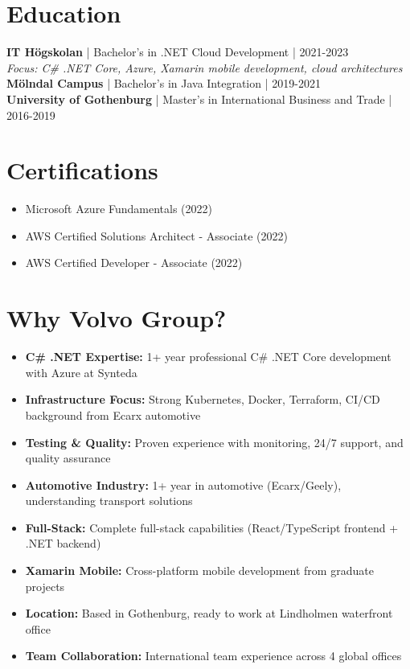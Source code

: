 \documentclass[11pt,a4paper]{article}
\begin{document}
\section*{Education}
\textbf{IT Högskolan} | Bachelor's in .NET Cloud Development | 2021-2023\\
\textit{Focus: C\# .NET Core, Azure, Xamarin mobile development, cloud architectures}\\[5pt]
\textbf{Mölndal Campus} | Bachelor's in Java Integration | 2019-2021\\
\textbf{University of Gothenburg} | Master's in International Business and Trade | 2016-2019

\section*{Certifications}
\begin{itemize}[noitemsep]
\item Microsoft Azure Fundamentals (2022)
\item AWS Certified Solutions Architect - Associate (2022)
\item AWS Certified Developer - Associate (2022)
\end{itemize}

\section*{Why Volvo Group?}
\begin{itemize}[noitemsep]
\item \textbf{C\# .NET Expertise:} 1+ year professional C\# .NET Core development with Azure at Synteda
\item \textbf{Infrastructure Focus:} Strong Kubernetes, Docker, Terraform, CI/CD background from Ecarx automotive
\item \textbf{Testing \& Quality:} Proven experience with monitoring, 24/7 support, and quality assurance
\item \textbf{Automotive Industry:} 1+ year in automotive (Ecarx/Geely), understanding transport solutions
\item \textbf{Full-Stack:} Complete full-stack capabilities (React/TypeScript frontend + .NET backend)
\item \textbf{Xamarin Mobile:} Cross-platform mobile development from graduate projects
\item \textbf{Location:} Based in Gothenburg, ready to work at Lindholmen waterfront office
\item \textbf{Team Collaboration:} International team experience across 4 global offices
\end{itemize}
\end{document}

